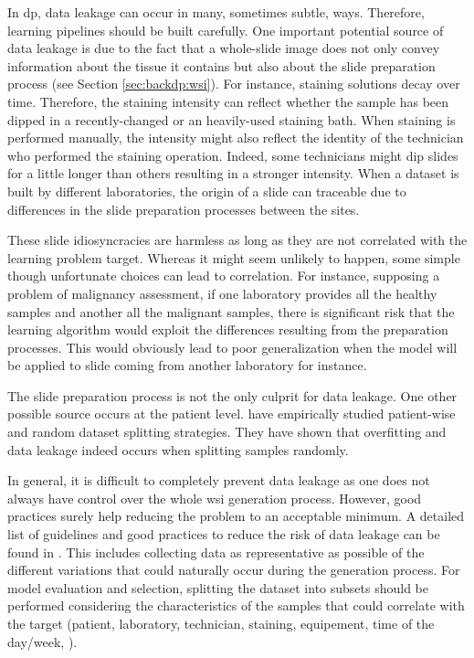 In \acrlong{dp}, data leakage can occur in many, sometimes subtle, ways. Therefore, learning pipelines should be built carefully. One important potential source of data leakage is due to the fact that a whole-slide image does not only convey information about the tissue it contains but also about the slide preparation process (see Section \ref{sec:backdp:wsi}). For instance, staining solutions decay over time. Therefore, the staining intensity can reflect whether the sample has been dipped in a recently-changed or an heavily-used staining bath. When staining is performed manually, the intensity might also reflect the identity of the technician who performed the staining operation. Indeed, some technicians might dip slides for a little longer than others resulting in a stronger intensity. When a dataset is built by different laboratories, the origin of a slide can traceable due to differences in the slide preparation processes between the sites. 

These slide idiosyncracies are harmless as long as they are not correlated with the learning problem target. Whereas it might seem unlikely to happen, some simple though unfortunate choices can lead to correlation. For instance, supposing a problem of malignancy assessment, if one laboratory provides all the healthy samples and another all the malignant samples, there is significant risk that the learning algorithm would exploit the differences resulting from the preparation processes. This would obviously lead to poor generalization when the model will be applied to slide coming from another laboratory for instance. 

The slide preparation process is not the only culprit for data leakage. One other possible source occurs at the patient level. \parencite{bussola2021ai} have empirically studied patient-wise and random dataset splitting strategies. They have shown that overfitting and data leakage indeed occurs when splitting samples randomly.


In general, it is difficult to completely prevent data leakage as one does not always have control over the whole \acrshort{wsi} generation process. However, good practices surely help reducing the problem to an acceptable minimum. A detailed list of guidelines and good practices to reduce the risk of data leakage can be found in \parencite{maree2017need}. This includes collecting data as representative as possible of the different variations that could naturally occur during the generation process. For model evaluation and selection, splitting the dataset into subsets should be performed considering the characteristics of the samples that could correlate with the target (\ie patient, laboratory, technician, staining, equipement, time of the day/week, \etc).

